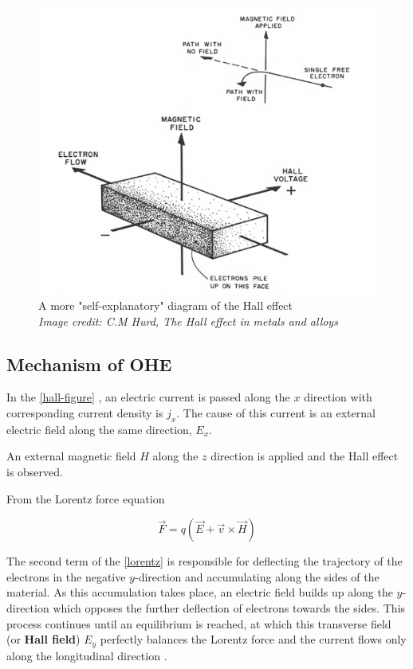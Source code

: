 \begin{figure}[h!]
    \includegraphics[width=\columnwidth]{hall-effect-hurd.png}
    \caption{A more "self-explanatory" diagram of the Hall effect\\ \textit{Image credit: C.M Hurd, The Hall effect in metals and alloys}}
\end{figure}

\subsection{Mechanism of OHE}

In the \cref{hall-figure} , an electric current is passed along the $ x $ direction with corresponding current density is $ j_x $.
The cause of this current is an external electric field along the same direction, $ E_x $.

An external magnetic field $ H $ along the $ z $ direction is applied and the Hall effect is observed.

From the Lorentz force equation

\begin{equation} \label{lorentz}
    \vec{F} = q (\vec{E} + \vec{v} \times \vec{H})
\end{equation}

The second term of the \cref{lorentz} is responsible for deflecting the trajectory of the electrons in the negative $ y $-direction and accumulating along the sides of the material.
As this accumulation takes place, an electric field builds up along the $ y $-direction which opposes the further deflection of electrons towards the sides.
This process continues until an equilibrium is reached, at which this transverse field (or \textbf{Hall field}) $ E_y $ perfectly balances the Lorentz force and the current flows only along the longitudinal direction \cite{ashcroft1976solid}.

